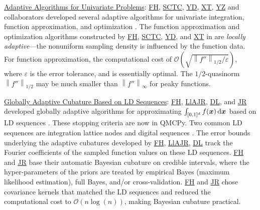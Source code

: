 \documentclass[11pt]{NSFamsart}
\newcommand{\Upara}[1]{\noindent\underline{#1}:\xspace}
\newcommand{\FH}{\hyperlink{FHlink}{FH}\xspace}
\newcommand{\SCTC}{\hyperlink{SCTClink}{SCTC}\xspace}
\newcommand{\YD}{\hyperlink{YDlink}{YD}\xspace}
\newcommand{\JR}{\hyperlink{JRlink}{JR}\xspace}
\newcommand{\LlAJR}{\hyperlink{LlAJRlink}{LlAJR}\xspace}
\newcommand{\XT}{\hyperlink{XTlink}{XT}\xspace}
\newcommand{\DL}{\hyperlink{DLlink}{DL}\xspace}
\newcommand{\YZ}{\hyperlink{YZlink}{YZ}\xspace}
\newcommand{\bx}{{\boldsymbol{x}}}
\def\dif{\textup{d}}
\def\abs#1{\ensuremath{\left \lvert #1 \right \rvert}}
\newcommand{\norm}[2][{}]{\ensuremath{\left \lVert #2 \right \rVert}_{#1}}
\newcommand{\Order}{\mathcal{O}}
\begin{document}

\Upara{Adaptive Algorithms for Univariate Problems}
\FH, \SCTC, \YD, \XT, \YZ and collaborators developed several adaptive algorithms for univariate integration, function approximation, and optimization \cite{ChoEtal17a,HicEtal14b,  Din15a, Ton14a, Zha18a}.  The function approximation and optimization algorithms constructed by \FH, \SCTC, \YD, and \XT in \cite{ChoEtal17a} are \emph{locally adaptive}---the nonuniform sampling density is influenced by the function data.  For function approximation, the computational cost of $\Order\left(\sqrt{\norm[1/2]{f''}/\varepsilon} \right)$, where $\varepsilon$ is the error tolerance, and is essentially optimal.  The $1/2$-quasinorm $\norm[1/2]{f''}$ may be much smaller than
$\norm[\infty]{f''}$ for peaky functions.


\Upara{Globally Adaptive Cubature Based on LD Sequences}
\FH, \LlAJR, \DL, and \JR developed globally adaptive algorithms for approximating $\int_{[0,1]^d} f(\bx) \, \dif \bx$ based on LD sequences \cite{HicJim16a,HicEtal17a,JimHic16a}.  These stopping criteria are now in QMCPy. Two common LD sequences are integration lattice nodes and digital sequences \cite{DicEtal14a}.  The error bounds underlying the adaptive cubatures developed by \FH, \LlAJR, \DL track the  Fourier coefficients of the sampled function values on these LD sequences.  \FH and \JR base their automatic Bayesian cubature on credible intervals, where the hyper-parameters of the priors are treated by empirical Bayes (maximum likelihood estimation), full Bayes, and/or cross-validation.   \FH and \JR chose covariance kernels that matched the LD sequences and reduced the computational cost to $\Order(n \log(n))$, making Bayesian cubature practical.
\end{document}
